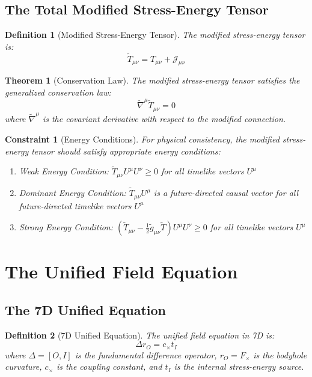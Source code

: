 \documentclass{article}
\newcommand{\tl}[1]{\tilde{#1}}
\newtheorem{theorem}{Theorem}
\newtheorem{definition}{Definition}
\newtheorem{constraint}{Constraint}
\begin{document}
\subsection{The Total Modified Stress-Energy Tensor}

\begin{definition}[Modified Stress-Energy Tensor]
The modified stress-energy tensor is:
\begin{equation}
\tl{T}_{\mu\nu} = T_{\mu\nu} + \mathcal{J}_{\mu\nu}
\end{equation}
\end{definition}

\begin{theorem}[Conservation Law]
The modified stress-energy tensor satisfies the generalized conservation law:
\begin{equation}
\tl{\nabla}^{\mu} \tl{T}_{\mu\nu} = 0
\end{equation}
where $\tl{\nabla}^{\mu}$ is the covariant derivative with respect to the modified connection.
\end{theorem}

\begin{constraint}[Energy Conditions]
For physical consistency, the modified stress-energy tensor should satisfy appropriate energy conditions:
\begin{enumerate}
\item Weak Energy Condition: $\tl{T}_{\mu\nu}U^{\mu}U^{\nu} \geq 0$ for all timelike vectors $U^{\mu}$
\item Dominant Energy Condition: $\tl{T}_{\mu\nu}U^{\mu}$ is a future-directed causal vector for all future-directed timelike vectors $U^{\mu}$
\item Strong Energy Condition: $(\tl{T}_{\mu\nu} - \frac{1}{2}\tl{g}_{\mu\nu}\tl{T})U^{\mu}U^{\nu} \geq 0$ for all timelike vectors $U^{\mu}$
\end{enumerate}
\end{constraint}

\section{The Unified Field Equation}

\subsection{The 7D Unified Equation}

\begin{definition}[7D Unified Equation]
The unified field equation in 7D is:
\begin{equation}
\Delta r_O = c_{\times} t_I
\end{equation}
where $\Delta = [O, I]$ is the fundamental difference operator, $r_O = F_{\times}$ is the bodyhole curvature, $c_{\times}$ is the coupling constant, and $t_I$ is the internal stress-energy source.
\end{definition}
\end{document}
